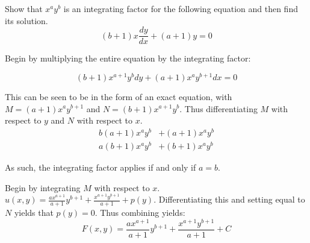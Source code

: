 Show that $x^ay^b$ is an integrating factor for the following equation and then find its solution.
\begin{equation*}
	(b+1)x\frac{dy}{dx}+(a+1)y=0
\end{equation*}

Begin by multiplying the entire equation by the integrating factor:

\begin{equation*}
	(b+1)x^{a+1}y^bdy+(a+1)x^ay^{b+1}dx=0
\end{equation*}

This can be seen to be in the form of an exact equation, with $M=(a+1)x^ay^{b+1}$ and $N=(b+1)x^{a+1}y^b$. Thus differentiating $M$ with respect to $y$ and $N$ with respect to $x$.
\begin{align*} 
b(a+1)x^ay^b &+(a+1)x^ay^b \\ 
a(b+1)x^ay^b &+(b+1)x^ay^b 
\end{align*}

As such, the integrating factor applies if and only if $a=b$. 

Begin by integrating $M$ with respect to $x$. $u(x,y)=\frac{ax^{a+1}}{a+1}y^{b+1}+\frac{x^{a+1}y^{b+1}}{a+1}+p(y)$. Differentiating this and setting equal to $N$ yields that $p(y)=0$. Thus combining yields:
\begin{equation*}
	\boxed{
	F(x,y)=\frac{ax^{a+1}}{a+1}y^{b+1}+\frac{x^{a+1}y^{b+1}}{a+1}+C}
\end{equation*}

